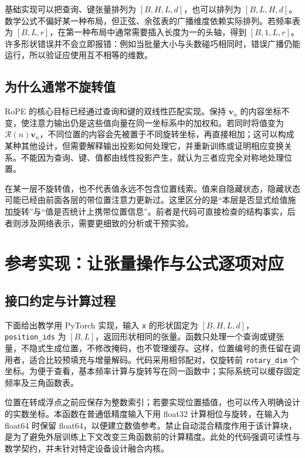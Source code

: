 \documentclass[UTF8,12pt,a4paper,fontset=fandol]{ctexart}
\begin{document}
基础实现可以把查询、键张量排列为 $[B,H,L,d]$，也可以排列为 $[B,L,H,d]$。数学公式不偏好某一种布局，但正弦、余弦表的广播维度依赖实际排列。若频率表为 $[B,L,r]$，在第一种布局中通常需要插入长度为一的头轴，得到 $[B,1,L,r]$。许多形状错误并不会立即报错：例如当批量大小与头数碰巧相同时，错误广播仍能运行，所以验证应使用互不相等的维数。

\subsection{为什么通常不旋转值}
RoPE 的核心目标已经通过查询和键的双线性匹配实现。保持 $\mathbf v_n$ 的内容坐标不变，使注意力输出仍是这些值向量在同一坐标系中的加权和。若同时将值变为 $\mathcal R(n)\mathbf v_n$，不同位置的内容会先被置于不同旋转坐标，再直接相加；这可以构成某种其他设计，但需要解释输出投影如何处理它，并重新训练或证明相应变换关系。不能因为查询、键、值都由线性投影产生，就认为三者应完全对称地处理位置。

在某一层不旋转值，也不代表值永远不包含位置线索。值来自隐藏状态，隐藏状态可能已经由前面各层的带位置注意力更新过。这里区分的是“本层是否显式给值施加旋转”与“值是否统计上携带位置信息”。前者是代码可直接检查的结构事实，后者则涉及网络表示，需要更细致的分析或干预实验。

\section{参考实现：让张量操作与公式逐项对应}
\label{sec:rope-code}

\subsection{接口约定与计算过程}
下面给出教学用 PyTorch 实现，输入 \texttt{x} 的形状固定为 $[B,H,L,d]$，\texttt{position\_ids} 为 $[B,L]$，返回形状相同的张量。函数只处理一个查询或键张量，不隐式生成位置，不修改掩码，也不管理缓存。这样，位置编号的责任留在调用者，适合比较预填充与增量解码。代码采用相邻配对，仅旋转前 \texttt{rotary\_dim} 个坐标。为便于查看，基本频率计算与旋转写在同一函数中；实际系统可以缓存固定频率及三角函数表。

位置在转成浮点之前应保存为整数索引；若要实现位置插值，也可以传入明确设计的实数坐标。本函数在普通低精度输入下用 float32 计算相位与旋转，在输入为 float64 时保留 float64，以便建立数值参考。禁止自动混合精度作用于该计算块，是为了避免外层训练上下文改变三角函数前的计算精度。此处的代码强调可读性与数学契约，并未针对特定设备设计融合内核。
\end{document}

